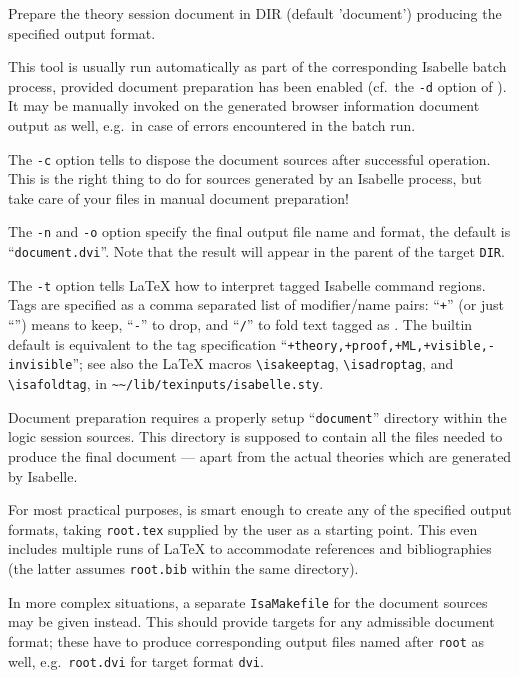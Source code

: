 \begin{isabellebody}
\begin{isamarkuptext}
\begin{ttbox}
  Prepare the theory session document in DIR (default 'document')
  producing the specified output format.
\end{ttbox}
  This tool is usually run automatically as part of the corresponding
  Isabelle batch process, provided document preparation has been
  enabled (cf.\ the \verb|-d| option of \hyperlink{tool.usedir}{\mbox{}}).
  It may be manually invoked on the generated browser information
  document output as well, e.g.\ in case of errors encountered in the
  batch run.

  \medskip The \verb|-c| option tells \hyperlink{tool.document}{\mbox{}} to
  dispose the document sources after successful operation.  This is
  the right thing to do for sources generated by an Isabelle process,
  but take care of your files in manual document preparation!

  \medskip The \verb|-n| and \verb|-o| option specify
  the final output file name and format, the default is ``\verb|document.dvi|''.  Note that the result will appear in the parent of
  the target \verb|DIR|.

  \medskip The \verb|-t| option tells {\LaTeX} how to interpret
  tagged Isabelle command regions.  Tags are specified as a comma
  separated list of modifier/name pairs: ``\verb|+|'' (or just ``'') means to keep, ``\verb|-|'' to drop, and ``\verb|/|'' to
  fold text tagged as .  The builtin default is equivalent
  to the tag specification ``\verb|+theory,+proof,+ML,+visible,-invisible|''; see also the {\LaTeX}
  macros \verb|\isakeeptag|, \verb|\isadroptag|, and
  \verb|\isafoldtag|, in \verb|~~/lib/texinputs/isabelle.sty|.

  \medskip Document preparation requires a properly setup ``\verb|document|'' directory within the logic session sources.  This
  directory is supposed to contain all the files needed to produce the
  final document --- apart from the actual theories which are
  generated by Isabelle.

  \medskip For most practical purposes, \hyperlink{tool.document}{\mbox{}} is smart
  enough to create any of the specified output formats, taking
  \verb|root.tex| supplied by the user as a starting point.  This
  even includes multiple runs of {\LaTeX} to accommodate references
  and bibliographies (the latter assumes \verb|root.bib| within
  the same directory).

  In more complex situations, a separate \verb|IsaMakefile| for
  the document sources may be given instead.  This should provide
  targets for any admissible document format; these have to produce
  corresponding output files named after \verb|root| as well,
  e.g.\ \verb|root.dvi| for target format \verb|dvi|.


\end{isamarkuptext}
\end{isabellebody}
